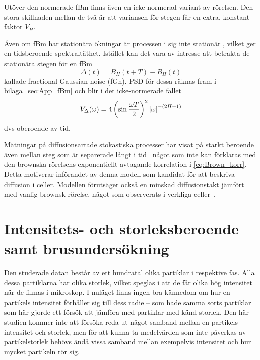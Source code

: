 Utöver den normerade fBm finns även en icke-normerad variant av rörelsen. Den stora skillnaden mellan de två är att variansen för stegen får en extra, konstant faktor $V_H$.

Även om fBm har stationära ökningar är processen i sig inte stationär \cite{Flandrin_fBmspektrum1989}, vilket ger en tidsberoende spektraltäthet. Istället kan det vara av intresse att betrakta de stationära stegen för en fBm
\begin{equation}
    \Delta(t)=B_H(t+T)-B_H(t)
\end{equation} 
kallade fractional Gaussian noise (fGn). PSD för dessa räknas fram i bilaga~\ref{sec:App_fBm} och blir i det icke-normerade fallet
\begin{equation}
    V_{\Delta}(\omega)=4\left(\sin{\frac{\omega T}{2}}\right)^2 \abs{\omega}^{-(2H+1)}
\end{equation}
dvs oberoende av tid.

Mätningar på diffusionsartade stokastiska processer har visat på starkt beroende även mellan steg som är separerade långt i tid~\cite{Mandelbrot_fBm1968} något som inte kan förklaras med den brownska rörelsens exponentiellt avtagande korrelation i \eqref{eq:Brown_korr}. Detta motiverar införandet av denna modell som kandidat för att beskriva diffusion i celler. Modellen förutsäger också en minskad diffusionstakt jämfört med vanlig brownsk rörelse, något som observerats i verkliga celler~\cite{Hofling&Franosch2013}.
    


\section{Intensitets- och storleksberoende samt brusundersökning}

Den studerade datan består av ett hundratal olika partiklar i respektive fas. Alla dessa partiklarna har olika storlek, vilket speglas i att de får olika hög intensitet när de filmas i mikroskop. I nuläget finns ingen bra kännedom om hur en partikels intensitet förhåller sig till dess radie -- \cite{Parry_etal2014} som hade samma sorts partiklar som här gjorde ett försök att jämföra med partiklar med känd storlek. Den här studien kommer inte att försöka reda ut något samband mellan en partikels intensitet och storlek, men för att kunna ta medelvärden som inte påverkas av partikelstorlek behövs ändå vissa samband mellan exempelvis intensitet och hur mycket partikeln rör sig. 


